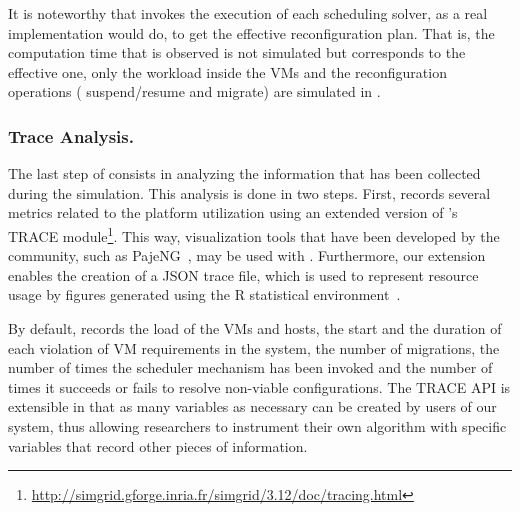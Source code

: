 It is noteworthy that \vmps invokes the execution of each scheduling
solver, as a real implementation would do, to get the effective
reconfiguration plan.  That is, the computation time that is observed
is not simulated but corresponds to the effective one, only the
workload inside the VMs and the reconfiguration operations (\ie
suspend/resume and migrate) are simulated in \sg.

\subsubsection{Trace Analysis.}
\label{subsec:traces-analysis}

The last step of \vmps consists in analyzing the information that has
been collected during the simulation.
This analysis is done in two steps. First, \vmps records several
metrics related to the platform
utilization %
using an extended version of \sg's TRACE
module\footnote{\url{http://simgrid.gforge.inria.fr/simgrid/3.12/doc/tracing.html}}.
This way, visualization tools that have been developed by the \sg
community, such as PajeNG~\cite{pageng:www}, may be used with
\vmps. Furthermore, our extension enables the creation of a JSON trace
file, which is used to represent resource usage by figures generated
using the R statistical environment~\cite{R:Bloomfield:2014}.

By default, \vmps records the load of the VMs and hosts, the
start and the duration of each violation of VM requirements in
the system, the number of migrations, the number of times the
scheduler mechanism has been invoked and the number of times it
succeeds or fails to resolve non-viable configurations.
%
The TRACE API is extensible in that as many variables as necessary can
be created by users of our system, thus allowing researchers to
instrument their own algorithm with specific variables that record
other pieces of information.




